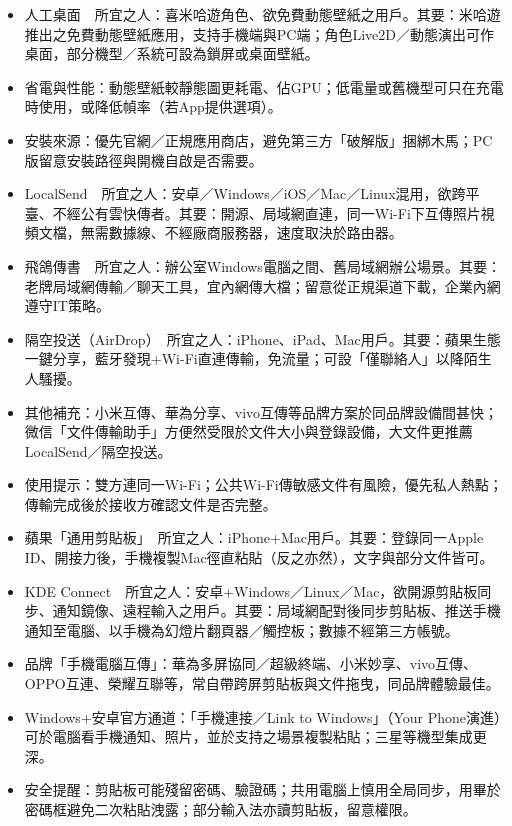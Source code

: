 
\begin{itemize}
  \item 人工桌面　所宜之人：喜米哈遊角色、欲免費動態壁紙之用戶。其要：米哈遊推出之免費動態壁紙應用，支持手機端與PC端；角色Live2D／動態演出可作桌面，部分機型／系統可設為鎖屏或桌面壁紙。
  \item 省電與性能：動態壁紙較靜態圖更耗電、佔GPU；低電量或舊機型可只在充電時使用，或降低幀率（若App提供選項）。
  \item 安裝來源：優先官網／正規應用商店，避免第三方「破解版」捆綁木馬；PC版留意安裝路徑與開機自啟是否需要。
\end{itemize}


\begin{itemize}
  \item LocalSend　所宜之人：安卓／Windows／iOS／Mac／Linux混用，欲跨平臺、不經公有雲快傳者。其要：開源、局域網直連，同一Wi-Fi下互傳照片視頻文檔，無需數據線、不經廠商服務器，速度取決於路由器。
  \item 飛鴿傳書　所宜之人：辦公室Windows電腦之間、舊局域網辦公場景。其要：老牌局域網傳輸／聊天工具，宜內網傳大檔；留意從正規渠道下載，企業內網遵守IT策略。
  \item 隔空投送（AirDrop）　所宜之人：iPhone、iPad、Mac用戶。其要：蘋果生態一鍵分享，藍牙發現+Wi-Fi直連傳輸，免流量；可設「僅聯絡人」以降陌生人騷擾。
  \item 其他補充：小米互傳、華為分享、vivo互傳等品牌方案於同品牌設備間甚快；微信「文件傳輸助手」方便然受限於文件大小與登錄設備，大文件更推薦LocalSend／隔空投送。
  \item 使用提示：雙方連同一Wi-Fi；公共Wi-Fi傳敏感文件有風險，優先私人熱點；傳輸完成後於接收方確認文件是否完整。
\end{itemize}


\begin{itemize}
  \item 蘋果「通用剪貼板」　所宜之人：iPhone+Mac用戶。其要：登錄同一Apple ID、開接力後，手機複製Mac徑直粘貼（反之亦然），文字與部分文件皆可。
  \item KDE Connect　所宜之人：安卓+Windows／Linux／Mac，欲開源剪貼板同步、通知鏡像、遠程輸入之用戶。其要：局域網配對後同步剪貼板、推送手機通知至電腦、以手機為幻燈片翻頁器／觸控板；數據不經第三方帳號。
  \item 品牌「手機電腦互傳」：華為多屏協同／超級終端、小米妙享、vivo互傳、OPPO互連、榮耀互聯等，常自帶跨屏剪貼板與文件拖曳，同品牌體驗最佳。
  \item Windows+安卓官方通道：「手機連接／Link to Windows」（Your Phone演進）可於電腦看手機通知、照片，並於支持之場景複製粘貼；三星等機型集成更深。
  \item 安全提醒：剪貼板可能殘留密碼、驗證碼；共用電腦上慎用全局同步，用畢於密碼框避免二次粘貼洩露；部分輸入法亦讀剪貼板，留意權限。
\end{itemize}


